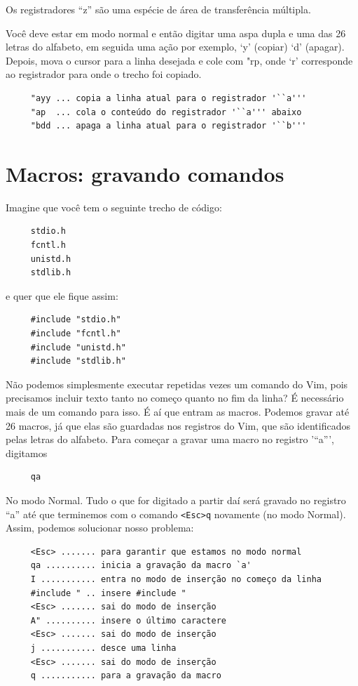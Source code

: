 \documentclass[10pt,a4paper,openany]{book}
\begin{document}
Os registradores ``z'' são uma espécie de área de transferência múltipla.

Você deve estar em modo normal e então digitar uma aspa dupla e uma
das 26 letras do alfabeto, em seguida uma ação por exemplo, `y'
(copiar) `d' (apagar). Depois, mova o cursor para a linha
desejada e cole com "rp, onde `r' corresponde ao
registrador para onde o trecho foi copiado.

\begin{verbatim}
     "ayy ... copia a linha atual para o registrador '``a'''
     "ap  ... cola o conteúdo do registrador '``a''' abaixo
     "bdd ... apaga a linha atual para o registrador '``b'''
\end{verbatim}

\section{Macros: gravando comandos}\label{Macros: gravando comandos}

Imagine que você tem o seguinte trecho de código:

\begin{verbatim}
     stdio.h
     fcntl.h
     unistd.h
     stdlib.h
\end{verbatim}

e quer que ele fique assim:

\begin{verbatim}
     #include "stdio.h"
     #include "fcntl.h"
     #include "unistd.h"
     #include "stdlib.h"
\end{verbatim}

Não podemos simplesmente executar repetidas vezes um comando do Vim, pois
precisamos incluir texto tanto no começo quanto no fim da linha?  É necessário
mais de um comando para isso.  É aí que entram as macros. Podemos gravar até 26
macros, já que elas são guardadas nos registros do Vim, que são identificados
pelas letras do alfabeto. Para começar a gravar uma macro no registro '``a''',
digitamos

\begin{verbatim}
     qa
\end{verbatim}

No modo Normal. Tudo o que for digitado a partir daí será gravado no
registro ``a'' até que terminemos com o comando
\verb|<Esc>q| novamente (no modo Normal). Assim,
podemos solucionar nosso problema:

\begin{verbatim}
     <Esc> ....... para garantir que estamos no modo normal
     qa .......... inicia a gravação da macro `a'
     I ........... entra no modo de inserção no começo da linha
     #include " .. insere #include "
     <Esc> ....... sai do modo de inserção
     A" .......... insere o último caractere
     <Esc> ....... sai do modo de inserção
     j ........... desce uma linha
     <Esc> ....... sai do modo de inserção
     q ........... para a gravação da macro
\end{verbatim}
\end{document}
